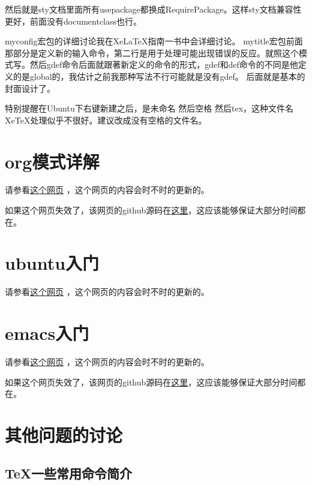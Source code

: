 \documentclass[11pt,oneside]{book}
\begin{document}
然后就是sty文档里面所有usepackage都换成RequirePackage。这样sty文档兼容性更好，前面没有documentclass也行。

myconfig宏包的详细讨论我在XeLaTeX指南一书中会详细讨论。
mytitle宏包前面那部分是定义新的输入命令，第二行是用于处理可能出现错误的反应。就照这个模式写。然后gdef命令后面就跟著新定义的命令的形式，gdef和def命令的不同是他定义的是global的，我估计之前我那种写法不行可能就是没有gdef。
后面就是基本的封面设计了。

特别提醒在Ubuntu下右键新建之后，是未命名 然后空格 然后tex，这种文件名XeTeX处理似乎不很好。建议改成没有空格的文件名。


\chapter{org模式详解}
请参看\href{http://www.cdwanze.org/emacs/org%E6%A8%A1%E5%BC%8F%E8%AF%A6%E8%A7%A3/org%E6%A8%A1%E5%BC%8F%E8%AF%A6%E8%A7%A3.html}{这个网页} ，这个网页的内容会时不时的更新的。

如果这个网页失效了，该网页的github源码在\href{https://github.com/a358003542/a358003542.github.io/tree/master/emacs/org%E6%A8%A1%E5%BC%8F%E8%AF%A6%E8%A7%A3}{这里}，这应该能够保证大部分时间都在。



\chapter{ubuntu入门}
请参看\href{http://www.cdwanze.org/linux/ubuntu%E5%85%A5%E9%97%A8/ubuntu%E5%85%A5%E9%97%A8.html}{这个网页} ，这个网页的内容会时不时的更新的。






\chapter{emacs入门}
\label{sec:emacs}
请参看\href{http://www.cdwanze.org/emacs/emacs%E5%85%A5%E9%97%A8/emacs%E5%85%A5%E9%97%A8.html}{这个网页} ，这个网页的内容会时不时的更新的。

如果这个网页失效了，该网页的github源码在\href{https://github.com/a358003542/a358003542.github.io/tree/master/emacs/emacs%E5%85%A5%E9%97%A8}{这里}，这应该能够保证大部分时间都在。




\chapter{其他问题的讨论}
\section{TeX一些常用命令简介}
\end{document}
